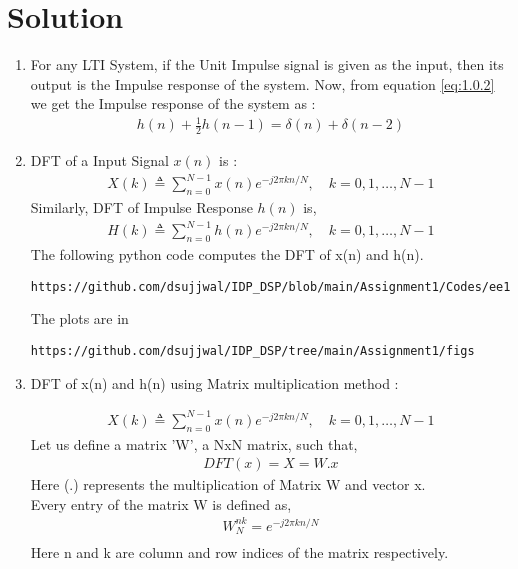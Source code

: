 \documentclass[journal,12pt,twocolumn]{IEEEtran}
\renewcommand\thesection{\arabic{section}}
\begin{document}
\section{Solution}
\begin{enumerate}[label=\thesection.\arabic*.,ref=\thesection.\theenumi]
\item
For any LTI System, if the Unit Impulse signal is given as the input, then its output is the Impulse response of the system.
Now, from equation \eqref{eq:1.0.2} we get the Impulse response of the system as :
\begin{align}
    h(n) + \frac{1}{2}h(n-1) = \delta(n) + \delta(n-2)	
\end{align}

\item DFT of a Input Signal $x(n)$ is :
\begin{align}
    X(k) \triangleq \sum_{n=0}^{N-1}x(n)e^{-j2\pi kn/N},\quad k=0,1, \ldots, N-1 \label{eq:2.0.2}
\end{align}
Similarly, DFT of Impulse Response $h(n)$ is,
\begin{align}
    H(k) \triangleq \sum_{n=0}^{N-1}h(n)e^{-j2\pi kn/N},\quad k=0,1, \ldots, N-1 \label{eq:2.0.3}
\end{align}
The following python code computes the DFT of x(n) and h(n).
\begin{lstlisting}
https://github.com/dsujjwal/IDP_DSP/blob/main/Assignment1/Codes/ee18btech11010.py
\end{lstlisting}
The plots are in
\begin{lstlisting}
https://github.com/dsujjwal/IDP_DSP/tree/main/Assignment1/figs
\end{lstlisting}

\item
DFT of x(n) and h(n) using Matrix multiplication method :


\begin{align}
    X(k) \triangleq \sum_{n=0}^{N-1}x(n)e^{-j2\pi kn/N},\quad k=0,1, \ldots, N-1
\end{align}
Let us define a matrix 'W', a NxN matrix, such that, 
\begin{align}
    DFT(x)= X = W.x  \label{eq:dftx}
\end{align}
Here (.) represents the multiplication of Matrix W and vector x. \\
Every entry of the matrix W is defined as, \\
\begin{align}
    W_N^{nk}=e^{-j2\pi kn/N} \\
\end{align}
Here n and k are column and row indices of the matrix respectively. \\


\end{enumerate}
\end{document}
